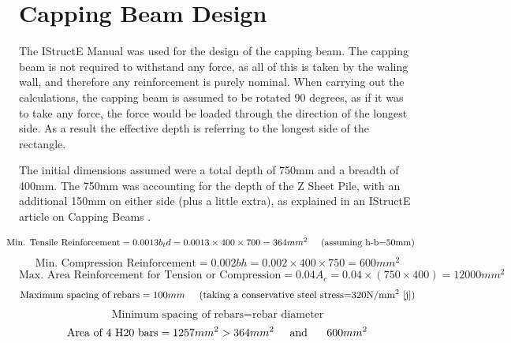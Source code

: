 \documentclass[12pt, a4paper]{article}
\begin{document}
\section{Capping Beam Design}
\begin{justify}
The IStructE Manual \cite{} was used for the design of the capping beam. The capping beam is not required to withstand any force, as all of this is taken by the waling wall, and therefore any reinforcement is purely nominal. When carrying out the calculations, the capping beam is assumed to be rotated 90 degrees, as if it was to take any force, the force would be loaded through the direction of the longest side. As a result the effective depth is referring to the longest side of the rectangle. 
\end{justify}
\begin{justify}
The initial dimensions assumed were a total depth of 750mm and a breadth of 400mm. The 750mm was accounting for the depth of the Z Sheet Pile, with an additional 150mm on either side (plus a little extra), as explained in an IStructE article on Capping Beams \cite{i}.
\end{justify}
\begin{equation}
\hspace*{-0.5cm}
    \text{Min. Tensile Reinforcement}=0.0013b_td=0.0013\times400\times700=364mm^2\hspace*{0.5cm}\text{(assuming h-b=50mm)}
\end{equation}
\begin{equation}
    \text{Min. Compression Reinforcement}=0.002bh=0.002\times400\times750=600mm^2
\end{equation}
\begin{equation}
    \text{Max. Area Reinforcement for Tension or Compression}=0.04A_c=0.04\times(750\times400)=12000mm^2
\end{equation}
\begin{equation}
    \text{Maximum spacing of rebars}=100mm \hspace*{0.5cm} \text{(taking a conservative steel stress=320N/mm$^2$ \cite{j})}
\end{equation}
\begin{equation}
    \text{Minimum spacing of rebars}=\text{rebar diameter}
\end{equation}
\begin{equation}
    \text{Area of 4 H20 bars}=1257mm^2>364mm^2\hspace*{0.5cm} \text{and}\hspace*{0.5cm} \ 600mm^2
\end{equation}
\end{document}
